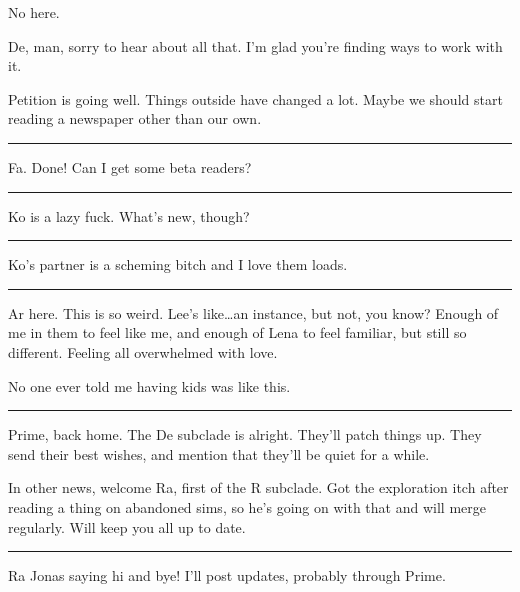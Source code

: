 No here.

De, man, sorry to hear about all that. I'm glad you're finding ways to work with it.

Petition is going well. Things outside have changed a lot. Maybe we should start reading a newspaper other than our own.

\begin{center}\rule{0.5\linewidth}{\linethickness}\end{center}

Fa. Done! Can I get some beta readers?

\begin{center}\rule{0.5\linewidth}{\linethickness}\end{center}

Ko is a lazy fuck. What's new, though?

\begin{center}\rule{0.5\linewidth}{\linethickness}\end{center}

Ko's partner is a scheming bitch and I love them loads.

\begin{center}\rule{0.5\linewidth}{\linethickness}\end{center}

Ar here. This is so weird. Lee's like\ldots{}an instance, but not, you know? Enough of me in them to feel like me, and enough of Lena to feel familiar, but still so different. Feeling all overwhelmed with love.

No one ever told me having kids was like this.

\begin{center}\rule{0.5\linewidth}{\linethickness}\end{center}

Prime, back home. The De subclade is alright. They'll patch things up. They send their best wishes, and mention that they'll be quiet for a while.

In other news, welcome Ra, first of the R subclade. Got the exploration itch after reading a thing on abandoned sims, so he's going on with that and will merge regularly. Will keep you all up to date.

\begin{center}\rule{0.5\linewidth}{\linethickness}\end{center}

Ra Jonas saying hi and bye! I'll post updates, probably through Prime.

